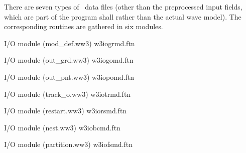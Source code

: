 \noindent
There are seven types of \ws\ data files (other than the preprocessed input
fields, which are part of the program shall rather than the actual wave
model). The corresponding routines are gathered in six modules.

\vspace{\baselineskip} \noindent
I/O module ({\file mod\_def.ww3}) \hfill {\file w3iogrmd.ftn}

\begin{flisti}
\end{flisti}

\noindent
I/O module ({\file out\_grd.ww3}) \hfill {\file w3iogomd.ftn}

\begin{flisti}
\end{flisti}

\noindent
I/O module ({\file out\_pnt.ww3}) \hfill {\file w3iopomd.ftn}

\begin{flisti}
\end{flisti}

\noindent
I/O module ({\file track\_o.ww3}) \hfill {\file w3iotrmd.ftn}

\begin{flisti}
\end{flisti}

\noindent
I/O module ({\file restart.ww3}) \hfill {\file w3iorsmd.ftn}

\begin{flisti}
\end{flisti}

\noindent
I/O module ({\file nest.ww3}) \hfill {\file w3iobcmd.ftn}

\begin{flisti}
\end{flisti}

\noindent
I/O module ({\file partition.ww3}) \hfill {\file w3iofsmd.ftn}

\begin{flisti}
\end{flisti}

